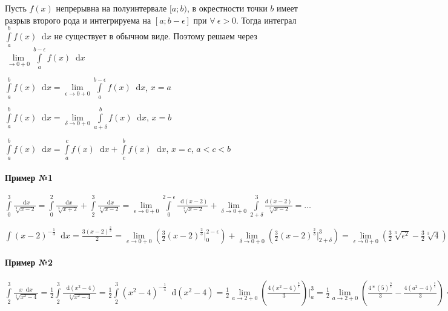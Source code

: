 \documentclass{article}
\newcommand*\diff{\mathop{}\!\mathrm{d}}
\begin{document}
Пусть $f(x)$ непрерывна на полуинтервале $[a; b)$, в окрестности точки $b$ имеет разрыв второго рода и интегрируема на $[a; b - \epsilon]$ при $\forall \ \epsilon > 0$. Тогда интеграл $\int\limits_{a}^{b} f(x) \diff x$ не существует в обычном виде. Поэтому решаем через $\lim\limits_{\to 0 + 0} \int\limits_{a}^{b - \epsilon} f(x) \diff x$


$\int\limits_{a}^{b} f(x) \diff x = \lim\limits_{\epsilon \to 0 + 0} \int\limits_{a}^{b - \epsilon} f(x) \diff x$, $x = a$

$\int\limits_{a}^{b} f(x) \diff x = \lim\limits_{\delta \to 0 + 0} \int\limits_{a + \delta}^{b} f(x) \diff x$, $x = b$

$\int\limits_{a}^{b} f(x) \diff x = \int\limits_{a}^{c} f(x) \diff x + \int\limits_{c}^{b} f(x) \diff x$, $x = c$, $a < c < b$

\paragraph{Пример №1}

$\int\limits_{0}^{3} \frac{\diff x}{\sqrt[3]{x - 2}} = \int\limits_{0}^{2} \frac{\diff x}{\sqrt[3]{x + 2}} + \int\limits_{2}^{3} \frac{\diff x}{\sqrt[3]{x - 2}} = \lim\limits_{\epsilon \to 0 + 0} \int\limits_{0}^{2 - \epsilon} \frac{\diff (x - 2)}{\sqrt[3]{x - 2}} + \lim\limits_{\delta \to 0 + 0} \int\limits_{2 + \delta}^{3} \frac{d (x - 2)}{\sqrt[3]{x - 2}} = \dots$

$\int (x - 2)^{-\frac{1}{3}} \diff x = \frac{3 (x - 2)^{\frac{2}{3}}}{2} = \lim\limits_{e \to 0 + 0} (\frac{3}{2} (x - 2)^{\frac{2}{3}} \bigg|_{0}^{2 - \epsilon}) + \lim\limits_{\delta \to 0 + 0} (\frac{3}{2} (x - 2)^{\frac{2}{3}} \bigg|_{2 + \delta}^{3}) = \lim\limits_{\epsilon \to 0 + 0} (\frac{3}{2} \sqrt[3]{\epsilon^2} - \frac{3}{2} \sqrt[3]{4}) + \lim\limits_{\delta \to 0 + 0} (\frac{3}{2} - \frac{3}{2} \sqrt[3]{\delta^2}) = \frac{3}{2} (1 - \sqrt[3]{4})$

\paragraph{Пример №2}

$\int\limits_{2}^{3} \frac{x \diff x}{\sqrt[4]{x^2 - 4}} = \frac{1}{2} \int\limits_{2}^{3} \frac{\diff (x^2 - 4)}{\sqrt[4]{x^2 - 4}} = \frac{1}{2} \int\limits_{2}^{3} (x^2 - 4)^{-\frac{1}{4}} \diff (x^2 - 4) = \frac{1}{2} \lim\limits_{a \to 2 + 0} (\frac{4 (x^2 - 4)^{\frac{3}{4}}}{3}) \bigg|_{a}^{3} = \frac{1}{2} \lim\limits_{a \to 2 + 0} (\frac{4 * (5)^{\frac{3}{4}}}{3} - \frac{4 (a^2 - 4)^{\frac{3}{4}}}{3}) = \frac{2 * \sqrt[4]{5^3}}{3}$
\end{document}
